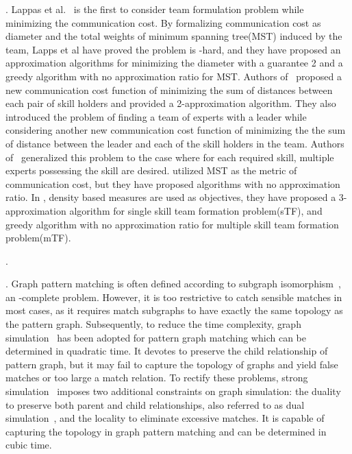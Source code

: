 . Lappas et al.~\cite{Lappas09} is the first to consider team formulation problem while minimizing the communication cost. By formalizing communication cost as diameter and the total weights of minimum spanning tree(MST) induced by the team, Lapps et al have proved the problem is \NP-hard, and they have proposed an approximation algorithms for minimizing the diameter with a guarantee 2 and a greedy algorithm with no approximation ratio for MST. Authors of~\cite{Kargar11} proposed a new communication cost function of minimizing the sum of distances between each pair of skill holders and provided a 2-approximation algorithm. They also introduced the problem of finding a team of experts with a leader while considering another new communication cost function of minimizing the the sum of distance between the leader and each of the skill holders in the team. Authors of~\cite{Chengte10,GajewarS12} generalized this problem to the case where for each required skill, multiple  experts possessing the skill are desired. \cite{Chengte10} utilized MST as the metric of communication cost, but they have proposed algorithms with no approximation ratio. In \cite{GajewarS12}, density based measures are used as objectives, they have proposed a 3-approximation algorithm for single skill team formation problem(sTF), and  greedy algorithm with no approximation ratio for multiple skill team formation problem(mTF).

.



. Graph pattern matching is often defined according to subgraph isomorphism~\cite{Aggarwal10,Galla06}, an \NP-complete problem. However, it is too restrictive to catch sensible matches in most cases, as it requires match subgraphs to have exactly the same topology as the pattern graph. Subsequently, to reduce the time complexity, graph simulation~\cite{ccs} has been adopted for pattern graph matching which can be determined in quadratic time. It devotes to preserve the child relationship of pattern graph, but it may fail to capture the topology of graphs and yield false matches or too large a match relation. To rectify these problems, strong simulation~\cite{MaCFHW11} imposes two additional constraints on graph simulation: the duality to preserve both parent and child relationships, also referred to as dual simulation~\cite{MaCFHW11}, and the locality to eliminate excessive matches. It is capable of capturing the topology in graph pattern matching and can be determined in cubic time.

